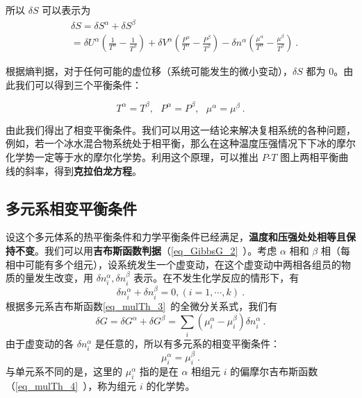 所以 $\delta S$ 可以表示为
\begin{equation}
\begin{aligned}
&\delta S=\delta S^\alpha+\delta S^\beta\\&=\delta U^\alpha\left(\frac{1}{T^\alpha}-\frac{1}{T^\beta}\right)+\delta V^\alpha\left(\frac{P^\alpha}{T^\alpha}-\frac{P^\beta}{T^\beta}\right)
-\delta n^\alpha\left(\frac{\mu^\alpha}{T^\alpha}-\frac{\mu^\beta}{T^\beta}\right)~.
\end{aligned}
\end{equation}

根据熵判据，对于任何可能的虚位移（系统可能发生的微小变动），$\delta S$ 都为 $0$。由此我们可以得到三个平衡条件：

\begin{equation}\label{eq_PhEquv_3}
T^\alpha=T^\beta,\ \ \ P^\alpha=P^\beta,\ \ \ \mu^\alpha=\mu^\beta~.
\end{equation}

由此我们得出了相变平衡条件。我们可以用这一结论来解决复相系统的各种问题，例如，若一个冰水混合物系统处于相平衡，那么在这种温度压强情况下下冰的摩尔化学势一定等于水的摩尔化学势。利用这个原理，可以推出 $P$-$T$ 图上两相平衡曲线的斜率，得到\textbf{克拉伯龙方程}。

\subsection{多元系相变平衡条件}

设这个多元体系的热平衡条件和力学平衡条件已经满足，\textbf{温度和压强处处相等且保持不变}。我们可以用\textbf{吉布斯函数判据}（\autoref{eq_GibbsG_2}~）。考虑 $\alpha$ 相和 $\beta$ 相（每相中可能有多个组元），设系统发生一个虚变动，在这个虚变动中两相各组员的物质的量发生改变，用 $\delta n_i^\alpha,\delta n_i^\beta$ 表示。在不发生化学反应的情形下，有
\begin{equation}
\delta n_i^\alpha+\delta n_i^\beta=0,(i=1,\cdots,k)~.
\end{equation}
根据多元系吉布斯函数\autoref{eq_mulTh_3}~的全微分关系式，我们有
\begin{equation}
\delta G=\delta G^\alpha+\delta G^\beta=\sum_i (\mu_i^\alpha-\mu_i^\beta)\delta n_i^\alpha~.
\end{equation}
由于虚变动的各 $\delta n_i^\alpha$ 是任意的，所以有多元系的相变平衡条件：
\begin{equation}
\mu_i^\alpha=\mu_i^\beta~.
\end{equation}
与单元系不同的是，这里的 $\mu_i^\alpha$ 指的是在 $\alpha$ 相组元 $i$ 的偏摩尔吉布斯函数（\autoref{eq_mulTh_4}~），称为组元 $i$ 的化学势。

